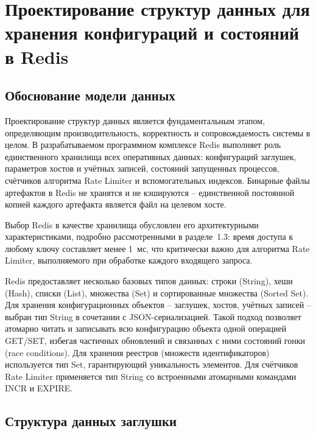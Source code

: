 \section{Проектирование структур данных для хранения конфигураций и состояний в Redis}

\subsection{Обоснование модели данных}

Проектирование структур данных является фундаментальным этапом, определяющим производительность, корректность и сопровождаемость системы в целом. В разрабатываемом программном комплексе Redis выполняет роль единственного хранилища всех оперативных данных: конфигураций заглушек, параметров хостов и учётных записей, состояний запущенных процессов, счётчиков алгоритма Rate Limiter и вспомогательных индексов. Бинарные файлы артефактов в Redis не хранятся и не кэшируются -- единственной постоянной копией каждого артефакта является файл на целевом хосте.

Выбор Redis в качестве хранилища обусловлен его архитектурными характеристиками, подробно рассмотренными в разделе~1.3: время доступа к любому ключу составляет менее 1~мс, что критически важно для алгоритма Rate Limiter, выполняемого при обработке каждого входящего запроса.

Redis предоставляет несколько базовых типов данных: строки (String), хеши (Hash), списки (List), множества (Set) и сортированные множества (Sorted Set). Для хранения конфигурационных объектов -- заглушек, хостов, учётных записей -- выбран тип String в сочетании с JSON-сериализацией. Такой подход позволяет атомарно читать и записывать всю конфигурацию объекта одной операцией GET/SET, избегая частичных обновлений и связанных с ними состояний гонки (race conditions). Для хранения реестров (множеств идентификаторов) используется тип Set, гарантирующий уникальность элементов. Для счётчиков Rate Limiter применяется тип String со встроенными атомарными командами INCR и EXPIRE.




\subsection{Структура данных заглушки}

